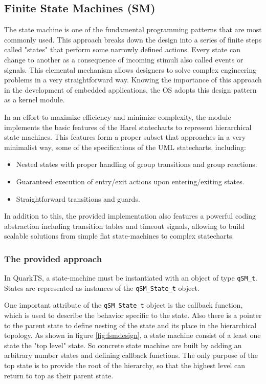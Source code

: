 \subsection{Finite State Machines (SM)}
The state machine is one of the fundamental programming patterns that are most commonly used. This approach breaks down the design into a series of finite steps called "states" that perform some narrowly defined actions. Every state can change to another as a consequence of incoming stimuli also called events or signals. This elemental mechanism allows designers to solve complex engineering problems in a very straightforward way.
Knowing the importance of this approach in the development of embedded applications, the OS adopts this design pattern as a kernel module.

In an effort to maximize efficiency and minimize complexity, the module implements the basic features of the Harel statecharts to represent hierarchical state machines. This features form a proper subset that approaches in a very minimalist way, some of the specifications of the UML statecharts, including:

\begin{itemize}
    \item Nested states with proper handling of group transitions and group reactions.
    \item Guaranteed execution of entry/exit actions upon entering/exiting states.
    \item Straightforward transitions and guards.
\end{itemize} 

In addition to this, the provided implementation also features a powerful coding abstraction including transition tables and timeout signals, allowing to build scalable solutions from simple flat state-machines to complex statecharts. 

\subsubsection{The provided approach}

In QuarkTS, a state-machine must be instantiated with an object of type \lstinline{qSM_t}. States are represented as instances of the \lstinline{qSM_State_t} object. 



One important attribute of the \lstinline{qSM_State_t} object is the callback function, which is used to describe the behavior specific to the state. Also there is a pointer to the parent state to define nesting of the state and its place in the hierarchical topology.
As shown in figure \ref{fig:fsmdesign}, a state machine consist of a least one state the "top level" state.
So concrete state machine are built by adding an arbitrary number states and defining callback functions. The only
purpose of the top state is to provide the root of the hierarchy, so that the highest level can return to top as their parent state. 

